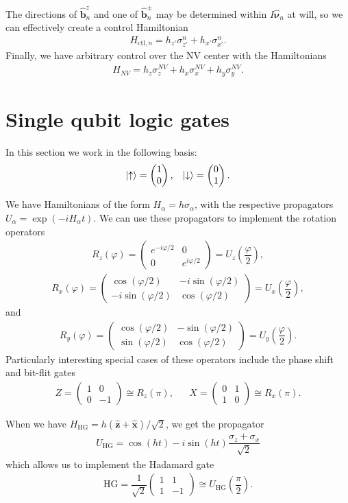 \documentclass[11pt]{article}
\renewcommand{\t}{\text} %
\newcommand{\f}[2]{\dfrac{#1}{#2}} %
\newcommand{\p}[1]{\left(#1\right)} %
\renewcommand{\v}{\bm} %
\newcommand{\uv}[1]{\hat{\v{#1}}} %
\renewcommand{\d}{\partial} %
\renewcommand{\phi}{\varphi} %
\newcommand{\m}[1]{\begin{pmatrix}#1\end{pmatrix}} %
\renewcommand{\u}{\uparrow}
\renewcommand{\d}{\downarrow}
\begin{document}
The directions of $\uv b_n^z$ and one of $\uv b_n^\pm$ may be
determined within $I\uv\nu_n$ at will, so we can effectively create a
control Hamiltonian
\begin{align}
  H_{\t{ctl},n}=h_{z'}\sigma_{z'}^n+h_{x'}\sigma_{x'}^n.
\end{align}
Finally, we have arbitrary control over the NV center with the
Hamiltonians
\begin{align}
  H_{NV}=h_z\sigma_z^{NV}+h_x\sigma_x^{NV}+h_y\sigma_y^{NV}.
\end{align}

\newpage
\section*{Single qubit logic gates}

In this section we work in the following basis:
\begin{align}
  \ket\u=\m{1\\0}, && \ket\d=\m{0\\1}.
\end{align}

We have Hamiltonians of the form $H_\alpha=h\sigma_\alpha$, with the
respective propagators $U_\alpha=\exp\p{-iH_\alpha t}$. We can use
these propagators to implement the rotation operators
\begin{align}
  R_z\p\phi=\m{e^{-i\phi/2}&0\\0&e^{i\phi/2}}=U_z\p{\f\phi2},
\end{align}
\begin{align}
  R_x\p\phi=\m{\cos\p{\phi/2}&-i\sin\p{\phi/2}\\
    -i\sin\p{\phi/2}&\cos\p{\phi/2}}=U_x\p{\f\phi2},
\end{align}
and
\begin{align}
  R_y\p\phi=\m{\cos\p{\phi/2}&-\sin\p{\phi/2}\\
    \sin\p{\phi/2}&\cos\p{\phi/2}}=U_y\p{\f\phi2}.
\end{align}
Particularly interesting special cases of these operators include the
phase shift and bit-flit gates
\begin{align}
  Z=\m{1&0\\0&-1}\cong R_z\p\pi, && X=\m{0&1\\1&0}\cong R_x\p\pi.
\end{align}

When we have $H_{\t{HG}}=h\p{\uv z+\uv x}/\sqrt2$, we get the
propagator
\begin{align}
  U_{\t{HG}}=\cos\p{ht}-i\sin\p{ht}\f{\sigma_z+\sigma_x}{\sqrt2}
\end{align}
which allows us to implement the Hadamard gate
\begin{align}
  \t{HG}=\f{1}{\sqrt2}\m{1&1\\1&-1}\cong U_{\t{HG}}\p{\f\pi2}.
\end{align}
\end{document}
